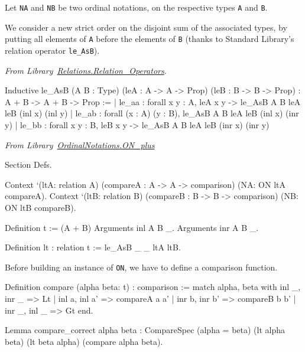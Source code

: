 \documentclass[a4paper]{book}
\begin{document}
Let \texttt{NA} and \texttt{NB} be two ordinal notations, on the respective types \texttt{A} and \texttt{B}.

 We consider a new strict order
on the disjoint sum of the associated types, by putting all elements of \texttt{A} before the elements of \texttt{B} (thanks to Standard Library's relation operator \texttt{le\_AsB}).



\emph{From Library~\href{https://coq.inria.fr/distrib/current/stdlib/Coq.Relations.Relation_Operators.html}{Relations.Relation\_Operators}}.

\begin{Coqanswer}
Inductive
le_AsB (A B : Type) (leA : A -> A -> Prop) (leB : B -> B -> Prop)
  : A + B -> A + B -> Prop :=
| le_aa : forall x y : A, leA x y -> le_AsB A B leA leB (inl x) (inl y)
| le_ab : forall (x : A) (y : B), le_AsB A B leA leB (inl x) (inr y)
| le_bb : forall x y : B, leB x y -> le_AsB A B leA leB (inr x) (inr y)
\end{Coqanswer}


\vspace{4pt}
\noindent\emph{From Library~\href{../src/html/hydras.OrdinalNotations/ON_plus.html}{OrdinalNotations.ON\_plus}}


\begin{Coqsrc}
Section Defs.

  Context `(ltA: relation A)
          (compareA : A -> A -> comparison)
          (NA: ON ltA compareA).
  Context `(ltB: relation B)
          (compareB : B -> B -> comparison)
          (NB: ON ltB compareB).


Definition t := (A + B)%
Arguments inl  {A B} _.
Arguments inr  {A B} _.

Definition lt : relation t := le_AsB _ _ ltA ltB.
\end{Coqsrc}

Before building an instance of \texttt{ON}, we have to define a comparison function.


\begin{Coqsrc}
Definition compare (alpha beta: t) : comparison :=
   match alpha, beta with
     inl _, inr _ => Lt
   | inl a, inl a' => compareA a a'
   | inr b, inr b' => compareB b b'
   | inr _, inl _ => Gt
  end.

Lemma compare_correct alpha beta :
    CompareSpec (alpha = beta) (lt alpha beta) (lt beta alpha)
                            (compare alpha beta).
\end{Coqsrc}
\end{document}
